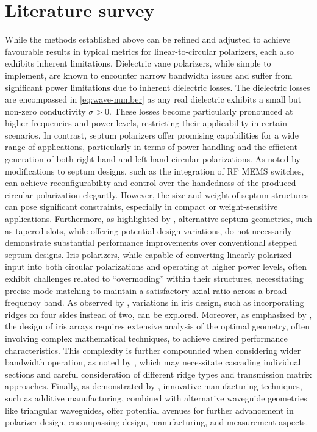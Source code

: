 \documentclass[11pt,a4paper,twoside,openany]{report}
\begin{document}
\section{Literature survey}
While the methods established above can be refined and adjusted to achieve favourable results in typical metrics for linear-to-circular polarizers, each also exhibits inherent limitations. Dielectric vane polarizers, while simple to implement, are known to encounter narrow bandwidth issues and suffer from significant power limitations due to inherent dielectric losses. The dielectric losses are encompassed in \cref{eq:wave-number} as any real dielectric exhibits a small but non-zero conductivity $\sigma > 0$. These losses become particularly pronounced at higher frequencies and power levels, restricting their applicability in certain scenarios. In contrast, septum polarizers offer promising capabilities for a wide range of applications, particularly in terms of power handling and the efficient generation of both right-hand and left-hand circular polarizations. As noted by \parencite{ruiz-cruz-et-al:compact-reconfigurable-waveguide-circular-polarizer} modifications to septum designs, such as the integration of RF MEMS switches, can achieve reconfigurability and control over the handedness of the produced circular polarization elegantly. However, the size and weight of septum structures can pose significant constraints, especially in compact or weight-sensitive applications. Furthermore, as highlighted by \parencite{wang-et-al:novel-square-rectangle-waveguide-septum-polarizer}, alternative septum geometries, such as tapered slots, while offering potential design variations, do not necessarily demonstrate substantial performance improvements over conventional stepped septum designs. Iris polarizers, while capable of converting linearly polarized input into both circular polarizations and operating at higher power levels, often exhibit challenges related to \enquote{overmoding} within their structures, necessitating precise mode-matching to maintain a satisfactory axial ratio across a broad frequency band. As observed by \parencite{song-et-al:design-of-wideband-quad-ridge-waveguide-polarizer}, variations in iris design, such as incorporating ridges on four sides instead of two, can be explored. Moreover, as emphasized by \parencite{virone-et-al:optimum-iris-set-concept-for-waveguide-polarizers}, the design of iris arrays requires extensive analysis of the optimal geometry, often involving complex mathematical techniques, to achieve desired performance characteristics. This complexity is further compounded when considering wider bandwidth operation, as noted by \parencite{piltyay-et-al:new-tunable-iris-post-square-waveguide-polarizers-for-satelliste-information-systems}, which may necessitate cascading individual sections and careful consideration of different ridge types and transmission matrix approaches. Finally, as demonstrated by \parencite{deutschmann-arne:broadband-septum-polarizer-with-triangular-common-port}, innovative manufacturing techniques, such as additive manufacturing, combined with alternative waveguide geometries like triangular waveguides, offer potential avenues for further advancement in polarizer design, encompassing design, manufacturing, and measurement aspects.
\end{document}
